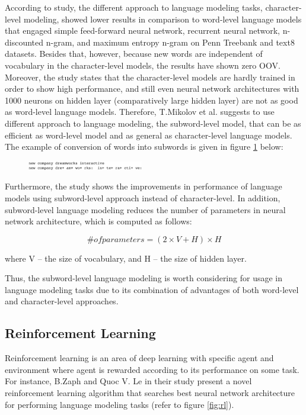 \documentclass{IEEEtran}
\begin{document}
According to \cite{Mikolov2011SubwordLM} study, the different approach to language modeling tasks, character-level modeling, showed lower results in comparison to word-level language models that engaged simple feed-forward neural network, recurrent neural network, n-discounted n-gram, and maximum entropy n-gram on Penn Treebank and text8 datasets. Besides that, however, because new words are independent of vocabulary in the character-level models, the results have shown zero OOV. Moreover, the study \cite{Mikolov2011SubwordLM} states that the character-level models are hardly trained in order to show high performance, and still even neural network architectures with 1000 neurons on hidden layer (comparatively large hidden layer) are not as good as word-level language models. Therefore, T.Mikolov et al. suggests to use different approach to language modeling, the subword-level model, that can be as efficient as word-level model and as general as character-level language models. The example of conversion of words into subwords is given in figure \ref{fig:subword} below:

\begin{figure}[h]
	\centering
	\includegraphics[width=0.45\textwidth]{subword}
	\label{fig:subword}
\end{figure}

Furthermore, the study shows the improvements in performance of language models using subword-level approach instead of character-level. In addition, subword-level language modeling reduces the number of parameters in neural network architecture, which is computed as follows:

\begin{equation}
	\# of parameters = (2 \times V + H) \times H
\end{equation}

where V -- the size of vocabulary, and H -- the size of hidden layer.

Thus, the subword-level language modeling is worth considering for usage in language modeling tasks due to its combination of advantages of both word-level and character-level approaches.

\subsection{Reinforcement Learning}

Reinforcement learning is an area of deep learning with specific agent and environment where agent is rewarded according to its performance on some task. For instance, B.Zaph and Quoc V. Le in their study \cite{Quoc2017Reinforcement} present a novel reinforcement learning algorithm that searches best neural network architecture for performing language modeling tasks (refer to figure \ref{fig:rl}).
\end{document}
